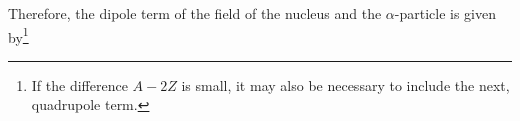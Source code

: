 Therefore, the dipole term of the field of the nucleus and the $\alpha$-particle
is given by\footnote{If the difference $A-2Z$ is small, it may also be necessary
to include the next, quadrupole term.}
